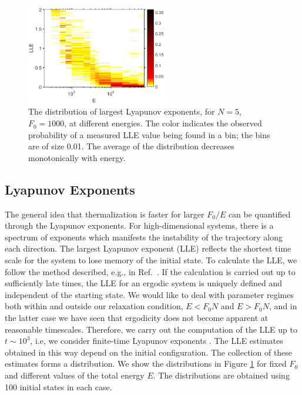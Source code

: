 \documentclass[a4paper, onecolumn]{revtex4-1}
\begin{document}
\begin{figure}[tb]
\centering
\includegraphics[width=0.55\textwidth]{ZhiyuPictures/LLEdistribution_1_11_pre_hot2_screenshot.png}
\caption{The distribution of largest Lyapunov exponents, for $N=5$, $F_0=1000$, at different
  energies.  The color indicates the observed probability of a measured LLE value being found in a
  bin; the bins are of size 0.01.  The average of the distribution decreases monotonically with
  energy.}  \label{fig:LLEdistribution1}
\end{figure}



\subsection{Lyapunov Exponents}

The general idea that thermalization is faster for larger $F_0/E$ can be quantified through the
Lyapunov exponents.  For high-dimensional systems, there is a spectrum of exponents which manifests
the instability of the trajectory along each direction. The largest Lyapunov exponent (LLE) reflects
the shortest time scale for the system to lose memory of the initial state.  To calculate the LLE,
we follow the method described, e.g., in Ref.~\cite{EckmannRuelle_RMP85}.  If the calculation is
carried out up to sufficiently late times, the LLE for an ergodic system is uniquely defined and
independent of the starting state.  We would like to deal with parameter regimes both within and
outside our relaxation condition, $E<F_0N$ and $E>F_0N$, and in the latter case we have seen that
ergodicity does not become apparent at reasonable timescales.  Therefore, we carry out the
computation of the LLE up to $t\sim10^3$, i.e, we consider finite-time Lyapunov exponents
\cite{FiniteTimeLyapunov}.  The LLE estimates obtained in this way depend on the initial
configuration.  The collection of these estimates forms a distribution.  We show the distributions
in Figure \ref{fig:LLEdistribution1} for fixed $F_0$ and different values of the total energy $E$.
The distributions are obtained using 100 initial states in each case.
\end{document}
